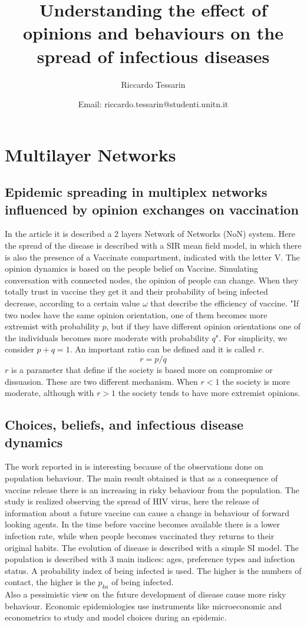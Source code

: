 \documentclass[a4paper,11pt]{scrartcl}
\title{Understanding the effect of opinions and behaviours on the spread of infectious diseases}
\subtitle{ }
\author{Riccardo Tessarin}
\date{ Email: riccardo.tessarin@studenti.unitn.it }
\begin{document}
	
	\maketitle
	\tableofcontents
	\pagebreak
	
	
\section{Multilayer Networks}

	\subsection{Epidemic spreading in multiplex networks influenced by opinion exchanges on vaccination}
	In the article \cite{AlvarezZuzek2017} it is described a 2 layers Network of Networks (NoN) system.
	Here the spread of the disease is described with a SIR mean field model, in which there is also the presence of a Vaccinate compartment, indicated with the letter V. 
	The opinion dynamics is based on the people belief on Vaccine. Simulating conversation with connected nodes, the opinion of people can change. When they totally trust in vaccine they get it and their probability of being infected decrease, according to a certain value $\omega$ that describe the efficiency of vaccine.
	"If two nodes have the same opinion orientation, one of them becomes more extremist with
	probability $p$, but if they have different opinion orientations one of the individuals becomes	more moderate with probability $q$". For simplicity, we consider $p + q = 1$. An important ratio can be defined and it is called $r$.
	\[r = p/q\] 
	$r$ is a parameter that define if the society is based more on compromise or dissuasion. These are two different mechanism. When $r<1$ the society is more moderate, although with $r>1$ the society tends to have more extremist opinions.
		
	\subsection{Choices, beliefs, and infectious disease dynamics }
	The work reported in \cite{AAuld2003} is interesting because  of the observations done on population behaviour. The main result obtained is that as a consequence of vaccine release there is an increasing in risky behaviour from the population. 
	The study is realized observing the spread of HIV virus, here the release of information about a future vaccine can cause a change in behaviour of forward looking agents. In the time before vaccine becomes available there is a lower infection rate, while when people becomes vaccinated they returns to their original habits. 
	The evolution of disease is described with a simple SI model. The population is described with 3 main indices: ages, preference types and infection status. A probability index of being infected is used. The higher is the numbers of contact, the higher is the $p_{ka}$ of being infected. \\
	Also a pessimistic view on the future development of disease cause more risky behaviour.
	Economic epidemiologies use instruments like microeconomic and econometrics to study and model choices during an epidemic. 
	
\end{document}
